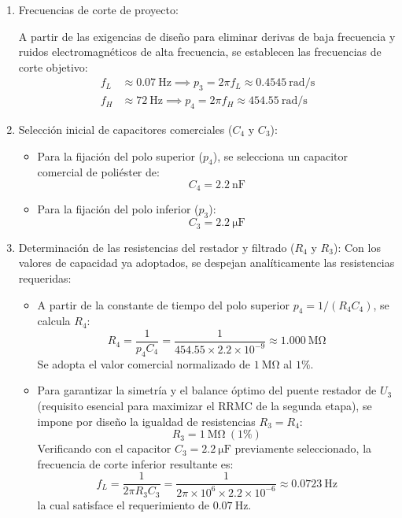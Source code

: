 \begin{enumerate}
  \item Frecuencias de corte de proyecto:

    A partir de las exigencias de diseño para eliminar derivas de baja frecuencia
    y ruidos electromagnéticos de alta frecuencia, se establecen las
    frecuencias de corte objetivo:
  \begin{align*}
    f_L &\approx \SI{0.07}{\hertz} \implies p_3 = 2\pi f_L \approx \SI{0.4545}{\radian/\second} \\
    f_H &\approx \SI{72}{\hertz} \implies p_4 = 2\pi f_H \approx \SI{454.55}{\radian/\second}
  \end{align*}

  \item Selección inicial de capacitores comerciales ($C_4$ y $C_3$):
  \begin{itemize}
    \item Para la fijación del polo superior ($p_4$), se selecciona un capacitor comercial de poliéster de:
    \begin{equation*}
      C_4 = \SI{2.2}{\nano\farad}
    \end{equation*}
    \item Para la fijación del polo inferior ($p_3$):
    \begin{equation*}
      C_3 = \SI{2.2}{\micro\farad}
    \end{equation*}
  \end{itemize}

  \item Determinación de las resistencias del restador y filtrado ($R_4$ y $R_3$):
  Con los valores de capacidad ya adoptados, se despejan analíticamente las resistencias requeridas:
  \begin{itemize}
    \item A partir de la constante de tiempo del polo superior $p_4 = 1 / (R_4 C_4)$, se calcula $R_4$:
    \begin{equation*}
      R_4 = \frac{1}{p_4 C_4} = \frac{1}{454.55 \times 2.2 \times 10^{-9}} \approx \SI{1.000}{\mega\ohm}
    \end{equation*}
    Se adopta el valor comercial normalizado de  $\SI{1}{\mega\ohm}$ al $1\%$.
    \item Para garantizar la simetría y el balance óptimo del puente restador de $U_3$ (requisito esencial para maximizar el RRMC de la segunda etapa), se impone por diseño la igualdad de resistencias $R_3 = R_4$:
    \begin{equation*}
      R_3 = \SI{1}{\mega\ohm}\ (1\%)
    \end{equation*}
    Verificando con el capacitor $C_3 = \SI{2.2}{\micro\farad}$ previamente seleccionado, la frecuencia de corte inferior resultante es:
    \begin{equation*}
      f_L = \frac{1}{2\pi R_3 C_3} = \frac{1}{2\pi \times 10^6 \times 2.2 \times 10^{-6}} \approx \SI{0.0723}{\hertz}
    \end{equation*}
    la cual satisface el requerimiento de $\SI{0.07}{\hertz}$.
  \end{itemize}


\end{enumerate}
